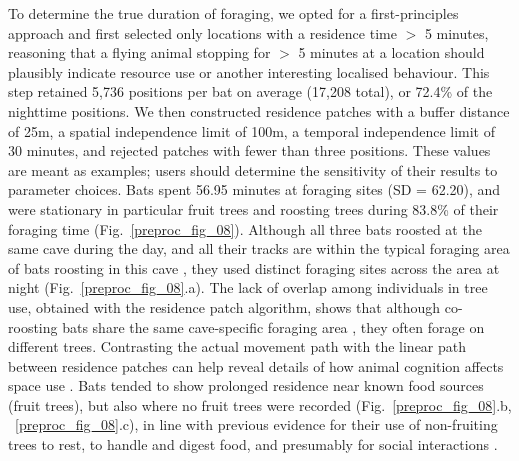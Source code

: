 To determine the true duration of foraging, we opted for a first-principles approach and first selected only locations with a residence time $>$ 5 minutes, reasoning that a flying animal stopping for $>$ 5 minutes at a location should plausibly indicate resource use or another interesting localised behaviour.
This step retained 5,736 positions per bat on average (17,208 total), or 72.4\% of the nighttime positions.
We then constructed residence patches with a buffer distance of 25m, a spatial independence limit of 100m, a temporal independence limit of 30 minutes, and rejected patches with fewer than three positions.
These values are meant as examples; users should determine the sensitivity of their results to parameter choices.
Bats spent 56.95 minutes at foraging sites (SD = 62.20), and were stationary in particular fruit trees and roosting trees during 83.8\% of their foraging time (Fig.~\ref{preproc_fig_08}).
Although all three bats roosted at the same cave during the day, and all their tracks are within the typical foraging area of bats roosting in this cave \citep{lourie2021}, they used distinct foraging sites across the area at night (Fig.~\ref{preproc_fig_08}.a). The lack of overlap among individuals in tree use, obtained with the residence patch algorithm, shows that although co-roosting bats share the same cave-specific foraging area \citep{lourie2021}, they often forage on different trees.
Contrasting the actual movement path with the linear path between residence patches can help reveal details of how animal cognition affects space use \citep{toledo2020}.
Bats tended to show prolonged residence near known food sources (fruit trees), but also where no fruit trees were recorded (Fig.~\ref{preproc_fig_08}.b, ~\ref{preproc_fig_08}.c), in line with previous evidence for their use of non-fruiting trees to rest, to handle and digest food, and presumably for social interactions \citep{tsoar2011}.

